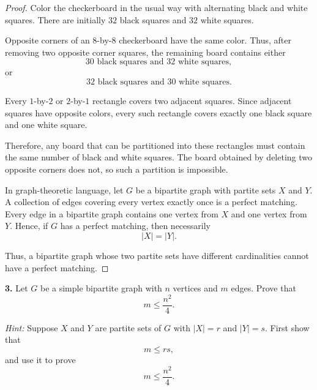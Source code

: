 \documentclass[12pt]{amsart}
\theoremstyle{conjecture}
\theoremstyle{definition}
\theoremstyle{question}
\theoremstyle{theorem}
\begin{document}
    \begin{proof}
        Color the checkerboard in the usual way with alternating black and
        white squares. There are initially $32$ black squares and $32$
        white squares.

        Opposite corners of an $8$-by-$8$ checkerboard have the same color.
        Thus, after removing two opposite corner squares, the remaining
        board contains either
        \[
            30\text{ black squares and }32\text{ white squares},
        \]
        or
        \[
            32\text{ black squares and }30\text{ white squares}.
        \]

        Every $1$-by-$2$ or $2$-by-$1$ rectangle covers two adjacent
        squares. Since adjacent squares have opposite colors, every such
        rectangle covers exactly one black square and one white square.

        Therefore, any board that can be partitioned into these rectangles
        must contain the same number of black and white squares. The board
        obtained by deleting two opposite corners does not, so such a
        partition is impossible.

        In graph-theoretic language, let $G$ be a bipartite graph with
        partite sets $X$ and $Y$. A collection of edges covering every
        vertex exactly once is a perfect matching. Every edge in a
        bipartite graph contains one vertex from $X$ and one vertex from
        $Y$. Hence, if $G$ has a perfect matching, then necessarily
        \[
            |X|=|Y|.
        \]

        Thus, a bipartite graph whose two partite sets have different
        cardinalities cannot have a perfect matching.
    \end{proof}

    \textbf{3.} Let $G$ be a simple bipartite graph with $n$ vertices and $m$
    edges. Prove that
    \[
        m \leq \frac{n^2}{4}.
    \]

    \medskip

    \noindent
    \textit{Hint:} Suppose $X$ and $Y$ are partite sets of $G$ with
    $|X|=r$ and $|Y|=s$. First show that
    \[
        m \leq rs,
    \]
    and use it to prove
    \[
        m \leq \frac{n^2}{4}.
    \]
\end{document}

